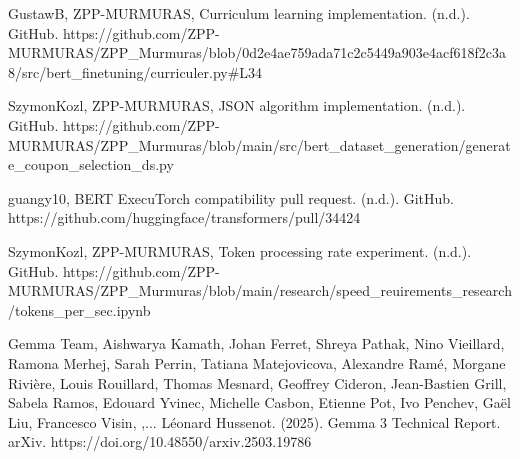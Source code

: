 \documentclass[licencjacka,en]{pracamgr}
\begin{document}
\begin{thebibliography}{99}
GustawB, ZPP-MURMURAS, Curriculum learning implementation. (n.d.). GitHub. https://github.com/ZPP-MURMURAS/ZPP\_Murmuras/blob/0d2e4ae759ada71c2c5449a903e4acf618f2c3a8/src/bert\_finetuning/curriculer.py\#L34

SzymonKozl, ZPP-MURMURAS, JSON algorithm implementation. (n.d.). GitHub. https://github.com/ZPP-MURMURAS/ZPP\_Murmuras/blob/main/src/bert\_dataset\_generation/generate\_coupon\_selection\_ds.py

guangy10, BERT ExecuTorch compatibility pull request. (n.d.). GitHub. https://github.com/huggingface/transformers/pull/34424

SzymonKozl, ZPP-MURMURAS, Token processing rate experiment. (n.d.). GitHub. https://github.com/ZPP-MURMURAS/ZPP\_Murmuras/blob/main/research/speed\_reuirements\_research/tokens\_per\_sec.ipynb

Gemma Team, Aishwarya Kamath, Johan Ferret, Shreya Pathak, Nino Vieillard, Ramona Merhej, Sarah Perrin, Tatiana Matejovicova, Alexandre Ramé, Morgane Rivière, Louis Rouillard, Thomas Mesnard, Geoffrey Cideron, Jean-Bastien Grill, Sabela Ramos, Edouard Yvinec, Michelle Casbon, Etienne Pot, Ivo Penchev, Gaël Liu, Francesco Visin, ,... Léonard Hussenot. (2025). Gemma 3 Technical Report. arXiv. https://doi.org/10.48550/arxiv.2503.19786

\end{thebibliography}
\end{document}
